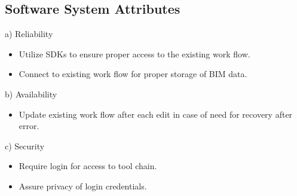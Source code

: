 \documentclass[onecolumn, draftclsnofoot,10pt, compsoc]{IEEEtran}
\begin{document}
    \subsection{Software System Attributes}
        \noindent a) Reliability%
        \begin{itemize}
            \item Utilize SDKs to ensure proper access to the existing work flow.
            \item Connect to existing work flow for proper storage of BIM data.
        \end{itemize}
        b) Availability%
        \begin{itemize}
            \item Update existing work flow after each edit in case of need for recovery after error.
        \end{itemize}
        c) Security%
        \begin{itemize}
            \item Require login for access to tool chain.
            \item Assure privacy of login credentials.
        \end{itemize}
\end{document}
